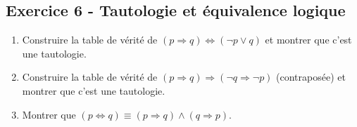 \documentclass[12pt,a4paper]{article}
\begin{document}
\subsection*{Exercice 6 - Tautologie et équivalence logique \niveau{\facile}}

\begin{boiteexercice}
\begin{enumerate}
  \item Construire la table de vérité de $(p\Rightarrow q)\Leftrightarrow(\neg p\vee q)$ et montrer que c'est une tautologie.
  \item Construire la table de vérité de $(p\Rightarrow q)\Rightarrow(\neg q\Rightarrow\neg p)$ (contraposée) et montrer que c'est une tautologie.
  \item Montrer que $(p\Leftrightarrow q)\equiv (p\Rightarrow q)\wedge(q\Rightarrow p)$.
\end{enumerate}
\end{boiteexercice}
\end{document}
